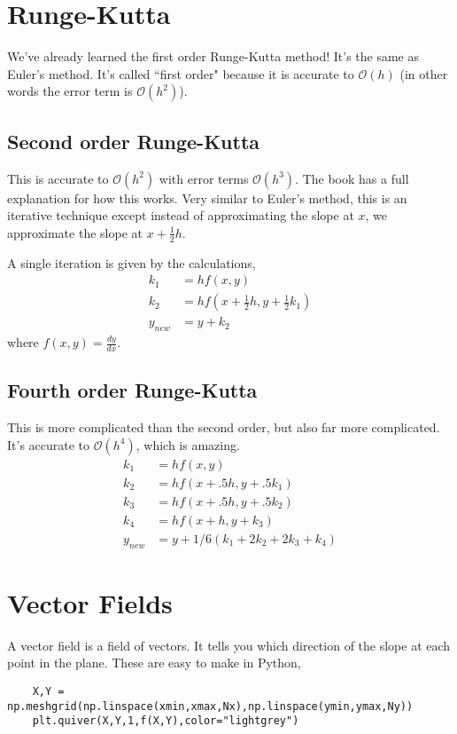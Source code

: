 \documentclass[11pt,letterpaper]{article}
\newcommand{\bigo}{\mathcal{O}}
\begin{document}
\section{Runge-Kutta}
We've already learned the first order Runge-Kutta method! It's the same as Euler's method. It's 
called ``first order" because it is accurate to $\bigo(h)$ (in other words the error term is
$\bigo(h^2)$).

\subsection{Second order Runge-Kutta}

This is accurate to $\bigo(h^2)$ with error terms $\bigo(h^3)$. The book has a full explanation
for how this works. Very similar to Euler's method, this is an iterative technique except instead
of approximating the slope at $x$, we approximate the slope at $x+\frac{1}{2}h$. 

A single iteration is given by the calculations,
\begin{align*}
 k_1 &= hf(x,y) \\ 
 k_2 &= hf(x+\frac{1}{2}h,y+\frac{1}{2}k_1)  \\
 y_{new} &= y + k_2 
\end{align*}
where $f(x,y) = \frac{dy}{dx}$.


\subsection{Fourth order Runge-Kutta}
This is more complicated than the second order, but also far more complicated. It's accurate to 
$\bigo(h^4)$, which is amazing.
\begin{align*}
        k_1 &= hf(x,y) \\ 
        k_2 &= hf(x+.5h,y+.5k_1) \\
        k_3 &= hf(x+.5h,y+.5k_2) \\
        k_4 &= hf(x+h,y+k_3) \\
        y_{new} &= y+1/6(k_1+2k_2+2k_3+k_4)
\end{align*}


\section{Vector Fields}
A vector field is a field of vectors. It tells you which direction of the slope at each point in
the plane. These are easy to make in Python,
\begin{verbatim}
    X,Y = np.meshgrid(np.linspace(xmin,xmax,Nx),np.linspace(ymin,ymax,Ny))
    plt.quiver(X,Y,1,f(X,Y),color="lightgrey")
\end{verbatim}
\end{document}
